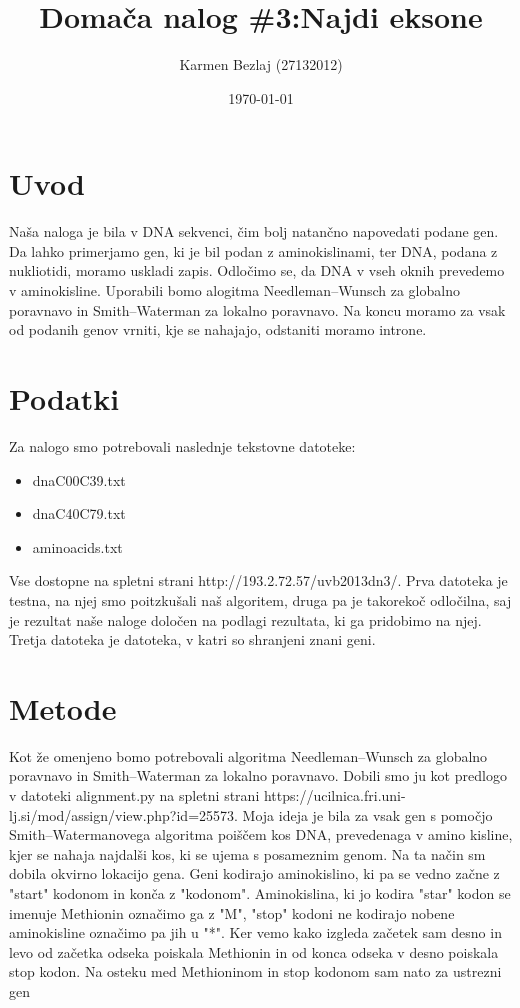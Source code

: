 \documentclass[a4paper,11pt]{article}
\title{Domača nalog \#3:Najdi eksone}
\author{Karmen Bezlaj (27132012)}
\date{\today}
\begin{document}
\maketitle

\section{Uvod}

Naša naloga je bila v DNA sekvenci, čim bolj natančno napovedati podane gen. Da lahko primerjamo gen, ki je bil podan z aminokislinami, ter DNA, podana z nukliotidi, moramo uskladi zapis. Odločimo se, da DNA v vseh oknih prevedemo v aminokisline. Uporabili bomo alogitma Needleman–Wunsch za globalno poravnavo in Smith–Waterman za lokalno poravnavo. 
Na koncu moramo za vsak od podanih genov vrniti, kje se nahajajo, odstaniti moramo introne.


\section{Podatki}

Za nalogo smo potrebovali naslednje tekstovne datoteke:
\begin{itemize}
\item dnaC00C39.txt 
\item dnaC40C79.txt 
\item aminoacids.txt
\end{itemize}
Vse dostopne na spletni strani http://193.2.72.57/uvb2013dn3/.
Prva datoteka je testna, na njej smo poitzkušali naš algoritem, druga pa je takorekoč odločilna, saj je rezultat naše naloge določen na podlagi rezultata, ki ga pridobimo na njej. Tretja datoteka je datoteka, v katri so shranjeni znani geni.

\section{Metode}

Kot že omenjeno bomo potrebovali algoritma Needleman–Wunsch za globalno poravnavo in Smith–Waterman za lokalno poravnavo. Dobili smo ju kot predlogo v datoteki  alignment.py na spletni strani https://ucilnica.fri.uni-lj.si/mod/assign/view.php?id=25573. Moja ideja je bila za vsak gen s pomočjo Smith–Watermanovega algoritma poiščem kos DNA, prevedenaga v amino kisline, kjer se nahaja najdalši kos, ki se ujema s posameznim genom. Na ta način sm dobila okvirno lokacijo gena. Geni kodirajo aminokislino, ki pa se vedno začne z "start" kodonom in konča z "kodonom". Aminokislina, ki jo kodira "star" kodon se imenuje Methionin označimo ga z "M",  "stop" kodoni ne kodirajo nobene aminokisline označimo pa jih u "*". Ker vemo kako izgleda začetek sam desno in levo od začetka odseka poiskala Methionin in od konca odseka v desno poiskala stop kodon. Na osteku med  Methioninom in stop kodonom sam nato za ustrezni gen 
\end{document}
